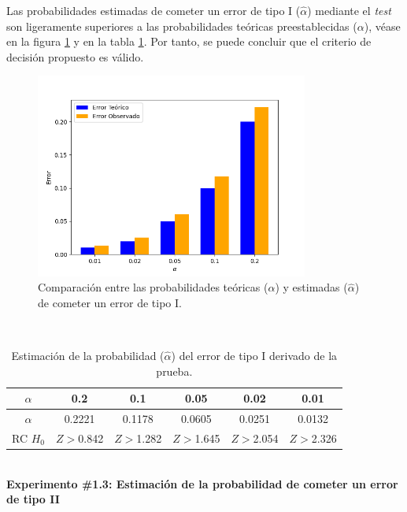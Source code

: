 \documentclass[12pt]{report}
\begin{document}
Las probabilidades estimadas de cometer un error de tipo I ($\hat{\alpha}$) mediante el \textit{test} son ligeramente superiores  a las probabilidades teóricas preestablecidas ($\alpha$), véase en la figura \ref{Teorico vs Observado} y en la tabla \ref{3td:error1-prob}. Por tanto, se puede concluir que el criterio de decisión propuesto es válido.
	\begin{figure}[ht]
	\centering
	
	\includegraphics[width=0.8\textwidth]{3td_teo_obs.png}
	\caption{Comparación entre las probabilidades teóricas ($\alpha$) y estimadas ($\hat{\alpha}$) de cometer un error de tipo I. }
	\label{Teorico vs Observado}
\end{figure}\\
\begin{table}[h!]
	\centering
	\begin{tabular}{|c|ccccc|}
		\hline
		$\alpha$ &  0.2 &  0.1 &  0.05 & 0.02 &  0.01 \\
		\hline
		$\hat{\alpha}$ & 0.2221 & 0.1178 & 0.0605 & 0.0251 & 0.0132 \\
		\hline
		RC $H_0$ &  $Z>$0.842& $Z>$1.282& $Z>$1.645& $Z>$2.054& $Z>$2.326 \\
		\hline
	\end{tabular}
	\caption{Estimación de la probabilidad ($\hat{\alpha}$) del error de tipo I derivado de la prueba.}
	\label{3td:error1-prob}
\end{table}
\\
\textbf{Experimento \#1.3: Estimación de la probabilidad de cometer un error de tipo II}
\end{document}
